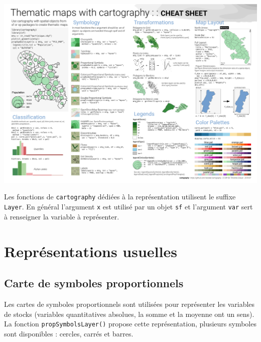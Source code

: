 \documentclass[]{book}
\begin{document}
\begin{center}\includegraphics[width=27.78in]{img/cheat_sheet} \end{center}

Les fonctions de \texttt{cartography} dédiées à la représentation
utilisent le suffixe \texttt{Layer}. En général l'argument \texttt{x}
est utilisé par un objet \texttt{sf} et l'argument \texttt{var} sert à
renseigner la variable à représenter.

\section{Représentations usuelles}\label{representations-usuelles}

\subsection{Carte de symboles
proportionnels}\label{carte-de-symboles-proportionnels}

Les cartes de symboles proportionnels sont utilisées pour représenter
les variables de stocks (variables quantitatives absolues, la somme et
la moyenne ont un sens). La fonction \texttt{propSymbolsLayer()} propose
cette représentation, plusieurs symboles sont disponibles : cercles,
carrés et barres.
\end{document}
